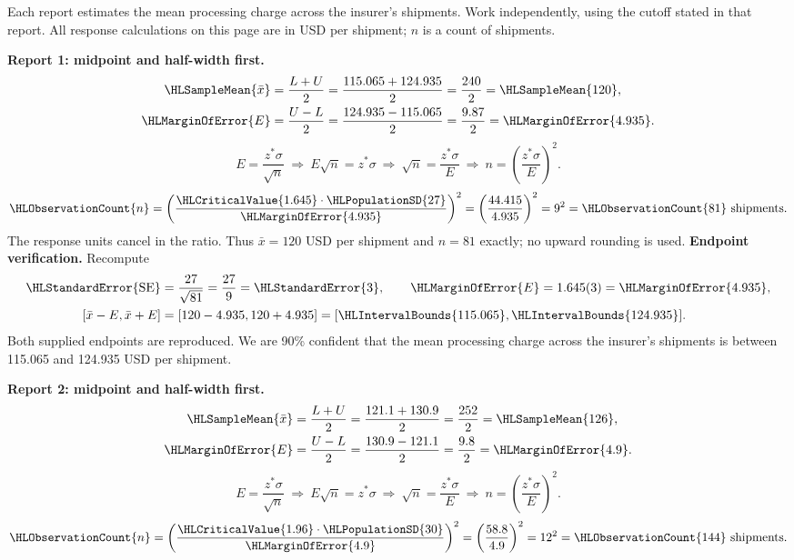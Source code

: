 Each report estimates the mean processing charge across the insurer's shipments. Work independently, using the cutoff stated in that report. All response calculations on this page are in USD per shipment; $n$ is a count of shipments.
\par\noindent\textbf{Report 1: midpoint and half-width first.}
\[\begin{aligned}
\HLSampleMean{\bar x}&=\frac{L+U}{2}=\frac{115.065+124.935}{2}=\frac{240}{2}=\HLSampleMean{120},\\
\HLMarginOfError{E}&=\frac{U-L}{2}=\frac{124.935-115.065}{2}=\frac{9.87}{2}=\HLMarginOfError{4.935}.
\end{aligned}\]
\[E=\frac{z^*\sigma}{\sqrt n}\ \Longrightarrow\ E\sqrt n=z^*\sigma\ \Longrightarrow\ \sqrt n=\frac{z^*\sigma}{E}\ \Longrightarrow\ n=\left(\frac{z^*\sigma}{E}\right)^2.\]
\[\HLObservationCount{n}=\left(\frac{\HLCriticalValue{1.645}\cdot\HLPopulationSD{27}}{\HLMarginOfError{4.935}}\right)^2=\left(\frac{44.415}{4.935}\right)^2=9^2=\HLObservationCount{81}\text{ shipments}.\]
The response units cancel in the ratio. Thus $\bar x=120$ USD per shipment and $n=81$ exactly; no upward rounding is used.
\textbf{Endpoint verification.} Recompute
\[\begin{aligned}
\HLStandardError{\mathrm{SE}}&=\frac{27}{\sqrt{81}}=\frac{27}{9}=\HLStandardError{3},\qquad \HLMarginOfError{E}=1.645(3)=\HLMarginOfError{4.935},\\
[\bar x-E,\bar x+E]&=[120-4.935,120+4.935]=[\HLIntervalBounds{115.065},\HLIntervalBounds{124.935}].
\end{aligned}\]
Both supplied endpoints are reproduced. We are 90\% confident that the mean processing charge across the insurer's shipments is between 115.065 and 124.935 USD per shipment.
\clearpage
\par\noindent\textbf{Report 2: midpoint and half-width first.}
\[\begin{aligned}
\HLSampleMean{\bar x}&=\frac{L+U}{2}=\frac{121.1+130.9}{2}=\frac{252}{2}=\HLSampleMean{126},\\
\HLMarginOfError{E}&=\frac{U-L}{2}=\frac{130.9-121.1}{2}=\frac{9.8}{2}=\HLMarginOfError{4.9}.
\end{aligned}\]
\[E=\frac{z^*\sigma}{\sqrt n}\ \Longrightarrow\ E\sqrt n=z^*\sigma\ \Longrightarrow\ \sqrt n=\frac{z^*\sigma}{E}\ \Longrightarrow\ n=\left(\frac{z^*\sigma}{E}\right)^2.\]
\[\HLObservationCount{n}=\left(\frac{\HLCriticalValue{1.96}\cdot\HLPopulationSD{30}}{\HLMarginOfError{4.9}}\right)^2=\left(\frac{58.8}{4.9}\right)^2=12^2=\HLObservationCount{144}\text{ shipments}.\]
